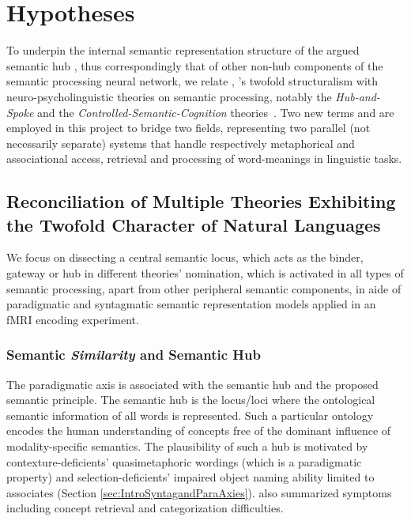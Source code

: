\chapter{Hypotheses} %
\label{chap:hypotheses} %

To underpin the internal semantic representation structure of the argued semantic hub \parencite{pattersonWhereYouKnow2007}, thus correspondingly that of other non-hub components of the semantic processing neural network, we relate \citeauthor{desaussureCoursLinguistiqueGenerale1969}, \citeauthor{jakobsonFundamentalsLanguage1963}'s twofold structuralism with neuro-psycholinguistic theories on semantic processing, notably the \emph{Hub-and-Spoke} and the \emph{Controlled-Semantic-Cognition} theories~\parencite{lambon-ralphNeuralComputationalBases2017}. Two new terms \similarity and \association are employed in this project to bridge two fields, representing two parallel (not necessarily separate) systems that handle respectively metaphorical and associational access, retrieval and processing of word-meanings in linguistic tasks.

\section{Reconciliation of Multiple Theories Exhibiting the Twofold Character of Natural Languages}

We focus on dissecting a central semantic locus, which acts as the binder, gateway or hub in different theories' nomination, which is activated in all types of semantic processing, apart from other peripheral semantic components, in aide of paradigmatic and syntagmatic semantic representation models applied in an fMRI encoding experiment. 

\subsection{Semantic \emph{Similarity} and Semantic Hub} 
\label{subsection:hypsemantichub}


The paradigmatic axis is associated with the semantic hub and the proposed semantic \similarity principle.
The semantic hub is the locus\slash loci where the ontological semantic information of all words is represented.  Such a particular ontology encodes the human understanding of concepts free of the dominant influence of modality-specific semantics. The plausibility of such a hub is motivated by contexture-deficients' quasimetaphoric wordings (which is a paradigmatic property) and selection-deficients' impaired object naming ability limited to associates (Section \ref{sec:IntroSyntagandParaAxies}). \textcite{pattersonWhereYouKnow2007} also summarized symptoms including concept retrieval and categorization difficulties. 

